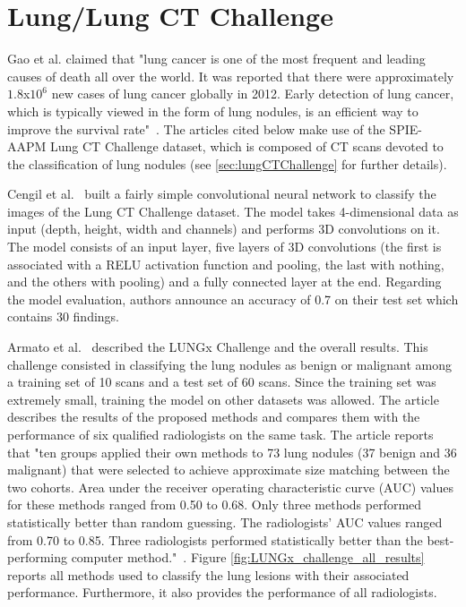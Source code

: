 \section{Lung/Lung CT Challenge}
\setlength{\marginparwidth}{3cm}\leavevmode {}Gao et al. claimed that "lung cancer is one of the most frequent and leading causes of death all over the world. It was reported that there were approximately $1.8$x$10^6$ new cases of lung cancer globally in 2012. Early detection of lung cancer, which is typically viewed in the form of lung nodules, is an efficient way to improve the survival rate"~\cite{41}. The articles cited below make use of the SPIE-AAPM Lung CT Challenge dataset, which is composed of CT scans devoted to the classification of lung nodules (see \ref{sec:lungCTChallenge} for further details).

Cengil et al.~\cite{02} built a fairly simple convolutional neural network to classify the images of the Lung CT Challenge dataset. The model takes 4-dimensional data as input (depth, height, width and channels) and performs 3D convolutions on it. The model consists of an input layer, five layers of 3D convolutions (the first is associated with a RELU activation function and pooling, the last with nothing, and the others with pooling) and a fully connected layer at the end. Regarding the model evaluation, authors announce an accuracy of 0.7 on their test set which contains 30 findings.

Armato et al.~\cite{12} described the LUNGx Challenge and the overall results. This challenge consisted in classifying the lung nodules as benign or malignant among a training set of 10 scans and a test set of 60 scans. Since the training set was extremely small, training the model on other datasets was allowed. The article describes the results of the proposed methods and compares them with the performance of six qualified radiologists on the same task. The article reports that "ten groups applied their own methods to 73 lung nodules (37 benign and 36 malignant) that were selected to achieve approximate size matching between the two cohorts. Area under the receiver operating characteristic curve (AUC) values for these methods ranged from 0.50 to 0.68. Only three methods performed statistically better than random guessing. The radiologists’ AUC values ranged from 0.70 to 0.85. Three radiologists performed statistically better than the best-performing computer method."~\cite{12}. Figure \ref{fig:LUNGx_challenge_all_results} reports all methods used to classify the lung lesions with their associated performance. Furthermore, it also provides the performance of all radiologists.

